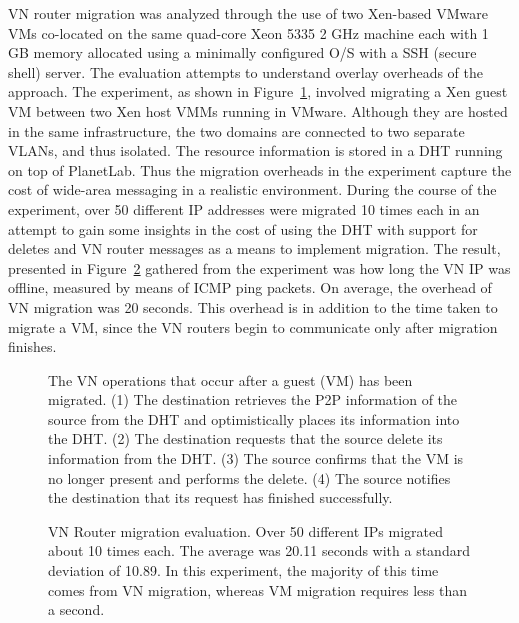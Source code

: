 VN router migration was analyzed through the use of two Xen-based VMware VMs
co-located on the same quad-core Xeon 5335 2 GHz machine each with 1 GB memory
allocated using a minimally configured O/S with a SSH (secure shell) server.
The evaluation attempts to understand overlay overheads of the approach.  The
experiment, as shown in Figure~\ref{fig:migration_ring}, involved migrating a
Xen guest VM between two Xen host VMMs running in VMware.  Although they are
hosted in the same infrastructure, the two domains are connected to two
separate VLANs, and thus isolated.  The resource information is stored in a DHT
running on top of PlanetLab.  Thus the migration overheads in the experiment
capture the cost of wide-area messaging in a realistic environment.  During the
course of the experiment, over 50 different IP addresses were migrated 10 times
each in an attempt to gain some insights in the cost of using the DHT with
support for deletes and VN router messages as a means to implement migration.
The result, presented in Figure~\ref{fig:mig} gathered from the experiment was
how long the VN IP was offline, measured by means of ICMP ping packets.  On
average, the overhead of VN migration was 20 seconds. This overhead is in
addition to the time taken to migrate a VM, since the VN routers begin to
communicate only after migration finishes. 

\begin{figure}
\centering
{}
\caption[VN Router migration]{The VN operations that occur after a guest (VM)
has been migrated.  (1) The destination retrieves the P2P information of the
source from the DHT and optimistically places its information into the DHT.
(2) The destination requests that the source delete its information from the
DHT.  (3)  The source confirms that the VM is no longer present and performs
the delete.  (4)  The source notifies the destination that its request has
finished successfully.}
\label{fig:migration_ring}
\end{figure}

\begin{figure}
\centering
{}
\caption[VN Router migration evaluation]{VN Router migration evaluation.  Over
50 different IPs migrated about 10 times each.  The average was 20.11 seconds
with a standard deviation of 10.89.  In this experiment, the majority of this
time comes from VN migration, whereas VM migration requires less than a second.}
\label{fig:mig}
\end{figure}

